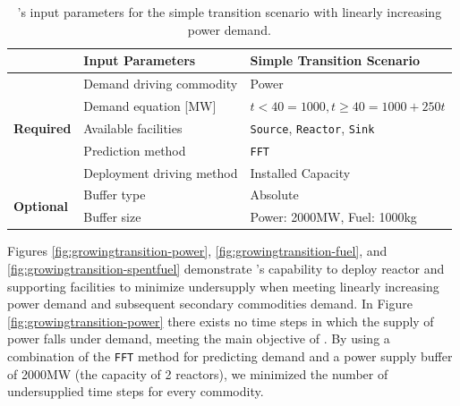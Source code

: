     \begin{table}[]
        \caption{\deploy's input parameters for the simple transition 
        scenario with linearly increasing power demand.}
        \label{tab:demonstrations}
        \begin{tabular}{l|ll}
        \hline
                                  & \textbf{Input Parameters}          & \textbf{Simple Transition Scenario} \\ \hline
        \multirow{5}{*}{\textbf{Required}} & Demand driving commodity  & \multicolumn{1}{l}{Power}                            \\
                                  & Demand equation [MW]          &  $t<40 = 1000, t\geq 40 = 1000+250t$                                                    \\
                                  & Available facilities    &  \texttt{Source}, \texttt{Reactor}, \texttt{Sink}                                                    \\
                                  & Prediction method         &  \texttt{FFT}                                                    \\
                                  & Deployment driving method & \multicolumn{1}{l}{Installed Capacity}               \\ \hline
        \multirow{2}{*}{\textbf{Optional}} & Buffer type               & \multicolumn{1}{l}{Absolute}                         \\
                                  & Buffer size               &  Power: 2000MW, Fuel: 1000kg                                                    \\ \hline
        \end{tabular}%
        \end{table}

Figures \ref{fig:growingtransition-power}, \ref{fig:growingtransition-fuel},
and \ref{fig:growingtransition-spentfuel} demonstrate \deploy's capability 
to deploy reactor and supporting facilities to minimize undersupply 
when meeting linearly increasing power demand and subsequent secondary 
commodities demand. 
In Figure \ref{fig:growingtransition-power} there exists no time steps 
in which the supply of power falls under demand, meeting the main 
objective of \deploy. 
By using a combination of the \texttt{FFT} method for 
predicting demand and a power supply buffer of 2000MW 
(the capacity of 2 reactors), we minimized the number of 
undersupplied time steps for every commodity.

